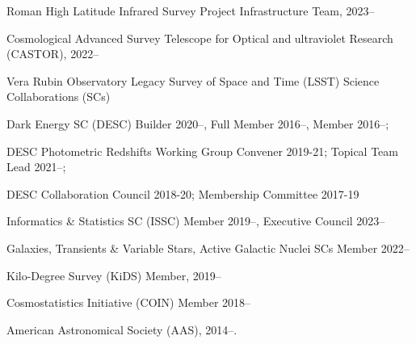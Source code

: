 \documentclass[11pt,letterpaper]{article}
\begin{document}
%

\begin{list}{}{\malzlist}
	\item Roman High Latitude Infrared Survey Project Infrastructure Team, 2023--
	\item Cosmological Advanced Survey Telescope for Optical and ultraviolet Research (CASTOR), 2022--
	\item Vera Rubin Observatory Legacy Survey of Space and Time (LSST) Science Collaborations (SCs)
	\begin{list}{}{\malzlist}
		\item Dark Energy SC (DESC) Builder 2020--, Full Member 2016--, Member 2016--;
		\item DESC Photometric Redshifts Working Group Convener 2019-21; Topical Team Lead 2021--;
		\item DESC Collaboration Council 2018-20; Membership Committee 2017-19
		\item Informatics \& Statistics SC (ISSC) Member 2019--, Executive Council 2023--%
		\item Galaxies, Transients \& Variable Stars, Active Galactic Nuclei SCs  Member 2022--
	\end{list}
	\item Kilo-Degree Survey (KiDS) Member, 2019--
	\item Cosmostatistics Initiative (COIN) Member 2018--
 \item American Astronomical Society (AAS), 2014--.
\end{list}
\end{document}
